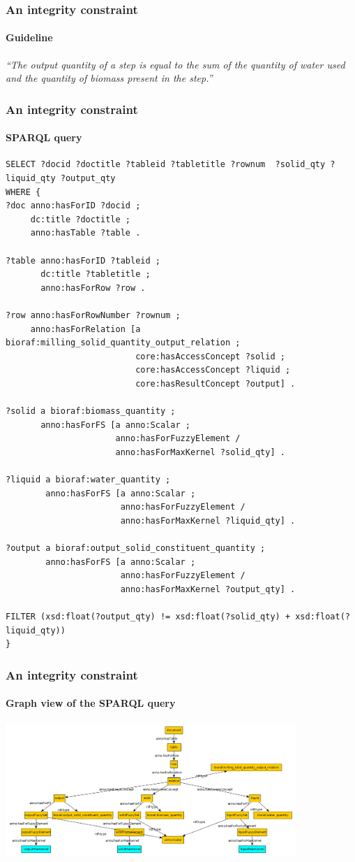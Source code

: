 \documentclass{beamer}
\begin{document}
\begin{frame}
  \frametitle{An integrity constraint}
  \framesubtitle{Guideline}

  \textit{``The output quantity of a step is equal to the sum of the quantity
  of water used and the quantity of biomass present in the step.''}
\end{frame}

\begin{frame}[fragile]
  \frametitle{An integrity constraint}
  \framesubtitle{SPARQL query}

  \begin{Verbatim}[fontsize=\tiny]
SELECT ?docid ?doctitle ?tableid ?tabletitle ?rownum  ?solid_qty ?liquid_qty ?output_qty
WHERE {
?doc anno:hasForID ?docid ;
     dc:title ?doctitle ;
     anno:hasTable ?table .

?table anno:hasForID ?tableid ;
       dc:title ?tabletitle ;
       anno:hasForRow ?row .

?row anno:hasForRowNumber ?rownum ;
     anno:hasForRelation [a bioraf:milling_solid_quantity_output_relation ;
                          core:hasAccessConcept ?solid ;
                          core:hasAccessConcept ?liquid ;
                          core:hasResultConcept ?output] .

?solid a bioraf:biomass_quantity ;
       anno:hasForFS [a anno:Scalar ;
                      anno:hasForFuzzyElement /
                      anno:hasForMaxKernel ?solid_qty] .

?liquid a bioraf:water_quantity ;
        anno:hasForFS [a anno:Scalar ;
                       anno:hasForFuzzyElement /
                       anno:hasForMaxKernel ?liquid_qty] .

?output a bioraf:output_solid_constituent_quantity ;
        anno:hasForFS [a anno:Scalar ;
                       anno:hasForFuzzyElement /
                       anno:hasForMaxKernel ?output_qty] .

FILTER (xsd:float(?output_qty) != xsd:float(?solid_qty) + xsd:float(?liquid_qty))
}
  \end{Verbatim}
\end{frame}

\begin{frame}
  \frametitle{An integrity constraint}
  \framesubtitle{Graph view of the SPARQL query}

  \begin{center}
  \includegraphics[width=11cm]{integrity-constraint.png}
  \end{center}
\end{frame}
\end{document}
